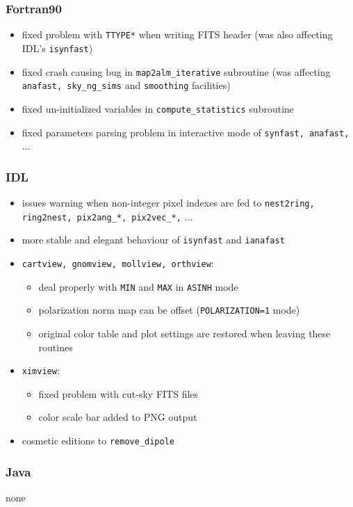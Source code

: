 \documentclass[12pt,twoside]{article}
\begin{document}
{{\subsubsection[Fortran90]{Fortran90}
	\begin{itemize}
	\item fixed problem with {\tt TTYPE*} when writing FITS header (was also
affecting IDL's {\tt isynfast})
	\item fixed crash causing bug in {\tt map2alm\_iterative} subroutine (was
affecting {\tt anafast, sky\_ng\_sims} and {\tt smoothing} facilities)
	\item fixed un-initialized variables in {\tt compute\_statistics} subroutine
	\item fixed parameters parsing problem in interactive mode of {\tt synfast, anafast,} ...
	\end{itemize}

\subsubsection[IDL]{IDL}
	\begin{itemize}
	\item issues warning when non-integer pixel indexes are fed to {\tt nest2ring, ring2nest, pix2ang\_*, pix2vec\_*,}   ...
	\item more stable and elegant behaviour of {\tt isynfast} and {\tt ianafast}
	\item {\tt cartview, gnomview, mollview, orthview}:
		\begin{itemize}
		\item deal properly with {\tt MIN} and {\tt MAX} in {\tt ASINH} mode
		\item polarization norm map can be offset ({\tt POLARIZATION=1} mode)
		\item original color table and plot settings are restored when
leaving these routines
		\end{itemize}
	\item {\tt ximview}:
		\begin{itemize}
		\item fixed problem with cut-sky FITS files
		\item color scale bar added to PNG output
		\end{itemize}
	\item cosmetic editions to {\tt remove\_dipole}
	\end{itemize}

\subsubsection[Java]{Java}
	none

}}
\end{document}
